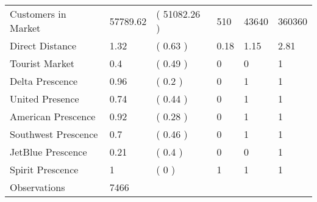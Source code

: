 \begin{tabular}[t]{llllll}
\hspace{1em}Customers in Market & 57789.62 & ( 51082.26 ) & 510 & 43640 & 360360\\
\hspace{1em}Direct Distance & 1.32 & ( 0.63 ) & 0.18 & 1.15 & 2.81\\
\hspace{1em}Tourist Market & 0.4 & ( 0.49 ) & 0 & 0 & 1\\
\hspace{1em}Delta Prescence & 0.96 & ( 0.2 ) & 0 & 1 & 1\\
\hspace{1em}United Presence & 0.74 & ( 0.44 ) & 0 & 1 & 1\\
\hspace{1em}American Prescence & 0.92 & ( 0.28 ) & 0 & 1 & 1\\
\hspace{1em}Southwest Prescence & 0.7 & ( 0.46 ) & 0 & 1 & 1\\
\hspace{1em}JetBlue Prescence & 0.21 & ( 0.4 ) & 0 & 0 & 1\\
\hspace{1em}Spirit Prescence & 1 & ( 0 ) & 1 & 1 & 1\\
\midrule
\hspace{1em}Observations & 7466 &  &  &  & \\
\bottomrule
\end{tabular}
